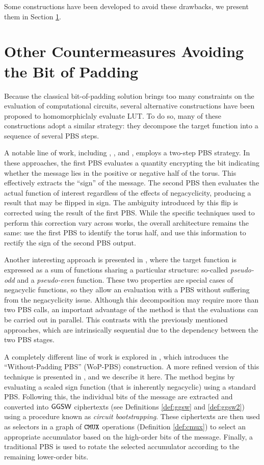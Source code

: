 Some constructions have been developed to avoid these drawbacks, we present them in Section \ref{sec:soa_padding_bit}.



\section{Other Countermeasures Avoiding the Bit of Padding}
\label{sec:soa_padding_bit}

Because the classical bit-of-padding solution brings too many constraints on the evaluation of computational circuits, several alternative constructions have been proposed to homomorphiclaly evaluate LUT. To do so, many of these constructions adopt a similar strategy: they decompose the target function into a sequence of several PBS steps. 

A notable line of work, including \cite{EPRINT:YXSCZ21}, \cite{AC:LiuMicPol22}, and \cite{TCHES:KluSch23}, employs a two-step PBS strategy. In these approaches, the first PBS evaluates a quantity  encrypting the bit indicating whether the message lies in the positive or negative half of the torus. This effectively extracts the ``sign'' of the message. The second PBS then evaluates the actual function of interest regardless of the effects of negacyclicity, producing a result that may be flipped in sign. The ambiguity introduced by this flip is corrected using the result of the first PBS. While the specific techniques used to perform this correction vary across works, the overall architecture remains the same: use the first PBS to identify the torus half, and use this information to rectify the sign of the second PBS output.

Another interesting approach is presented in \cite{AFRICACRYPT:CBSZ23}, where the target function is expressed as a sum of functions sharing a particular structure: so-called \textit{pseudo-odd} and a \textit{pseudo-even} function. These two properties are special cases of negacyclic functions, so they allow an evaluation with a PBS without suffering from the negacyclicity issue. Although this decomposition may require more than two PBS calls, an important advantage of the method is that the evaluations can be carried out in parallel. This contrasts with the previously mentioned approaches, which are intrinsically sequential due to the dependency between the two PBS stages.

A completely different line of work is explored in \cite{AC:CLOT21}, which introduces the “Without-Padding PBS” (WoP-PBS) construction. A more refined version of this technique is presented in \cite{JC:BBBCLO23}, and we describe it here. The method begins by evaluating a scaled sign function (that is inherently negacyclic) using a standard PBS. Following this, the individual bits of the message are extracted and converted into $\textsf{GGSW}$ ciphertexts (see Definitions \ref{def:ggsw} and \ref{def:ggsw2}) using a procedure known as \textit{circuit bootstrapping}. These ciphertexts are then used as selectors in a graph of $\texttt{CMUX}$ operations (Definition \ref{def:cmux}) to select an appropriate accumulator based on the high-order bits of the message. Finally, a traditional PBS is used to rotate the selected accumulator according to the remaining lower-order bits.

